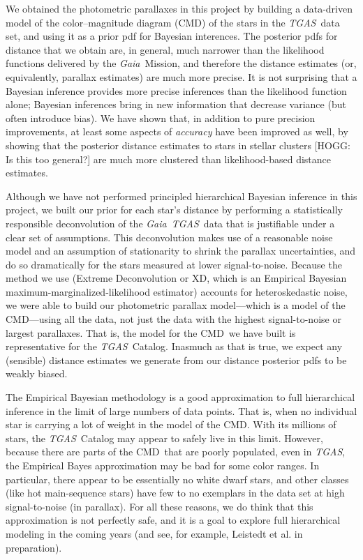 \documentclass[modern]{aastex61}
\newcommand{\acronym}[1]{{\small{#1}}}
\newcommand{\project}[1]{\textsl{#1}}
\newcommand{\tgas}{\project{\acronym{TGAS}}}
\newcommand{\gaia}{\project{Gaia}}
\newcommand{\xd}{\acronym{XD}}
\newcommand{\cmd}{\acronym{CMD}}
\begin{document}
We obtained the photometric parallaxes in this project
by building a data-driven model of the
color--magnitude diagram (\cmd) of the stars in the \tgas\ data set,
and using it as a prior pdf for Bayesian interences.
The posterior pdfs for distance that we obtain are, in general, much
narrower than the likelihood functions delivered by the
\gaia\ Mission, and therefore the distance estimates (or,
equivalently, parallax estimates) are much more precise.
It is not surprising that a Bayesian inference provides more
precise inferences than the likelihood function alone; Bayesian
inferences bring in new information that decrease variance (but
often introduce bias).
We have shown that, in addition to pure precision improvements, at
least some aspects of \emph{accuracy} have been improved as well, by
showing that the posterior distance estimates to stars in stellar
clusters [HOGG: Is this too general?] are much more clustered than likelihood-based distance
estimates.

Although we have not performed principled hierarchical Bayesian inference in this
project, we built our prior for each star's distance by
performing a statistically responsible deconvolution
of the \gaia\ \tgas\ data that is justifiable under a clear set of
assumptions.
This deconvolution makes use of a reasonable noise model and an
assumption of stationarity to shrink the parallax uncertainties, and
do so dramatically for the stars measured at lower signal-to-noise.
Because the method we use (Extreme Deconvolution or \xd, which is
an Empirical Bayesian maximum-marginalized-likelihood estimator) accounts for
heteroskedastic noise, we were able to build our photometric parallax
model---which is a model of the \cmd---using
all the data, not just the data with the highest signal-to-noise or
largest parallaxes.
That is, the model for the \cmd\ we have built is representative for
the \tgas\ Catalog.
Inasmuch as that is true, we expect any (sensible) distance estimates
we generate from our distance posterior pdfs to be weakly biased.

The Empirical Bayesian methodology is a good approximation to full
hierarchical inference in the limit of large numbers of data points.
That is, when no individual star is carrying a lot of weight in the
model of the \cmd.
With its millions of stars, the \tgas\ Catalog may appear to safely
live in this limit.
However, because there are parts of the \cmd\ that are poorly populated,
even in \tgas, the Empirical Bayes approximation may be bad for some
color ranges.
In particular, there appear to be essentially no white dwarf stars,
and other classes (like hot main-sequence stars) have few to no exemplars
in the data set at high signal-to-noise (in parallax).
For all these reasons, we do think that this approximation is not perfectly
safe, and it is a goal to explore full hierarchical modeling in the coming
years (and see, for example, Leistedt et al. in preparation).
\end{document}
